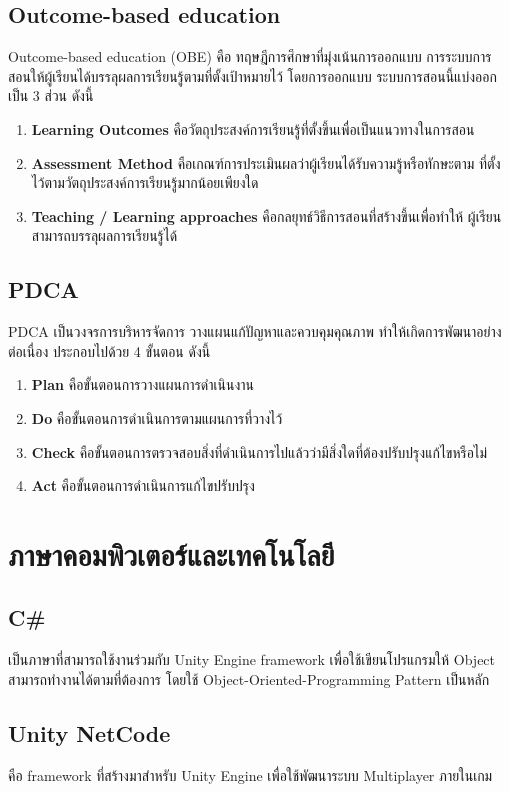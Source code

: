 \documentclass[12pt,oneside,openright,a4paper]{cpe-thai-project}
\begin{document}
\subsection{Outcome-based education \cite{obe}}
Outcome-based education (OBE) คือ ทฤษฎีการศึกษาที่มุ่งเน้นการออกแบบ
การระบบการสอนให้ผู้เรียนได้บรรลุผลการเรียนรู้ตามที่ตั้งเป้าหมายไว้ โดยการออกแบบ
ระบบการสอนนี้แบ่งออกเป็น 3 ส่วน ดังนี้
\begin{enumerate}
  \item \textbf{Learning Outcomes} คือวัตถุประสงค์การเรียนรู้ที่ตั้งขึ้นเพื่อเป็นแนวทางในการสอน
  \item \textbf{Assessment Method} คือเกณฑ์การประเมินผลว่าผู้เรียนได้รับความรู้หรือทักษะตาม
  ที่ตั้งไว้ตามวัตถุประสงค์การเรียนรู้มากน้อยเพียงใด
  \item \textbf{Teaching / Learning approaches} คือกลยุทธ์วิธีการสอนที่สร้างขึ้นเพื่อทำให้
  ผู้เรียนสามารถบรรลุผลการเรียนรู้ได้
\end{enumerate}


\subsection{PDCA \cite{pdca10}}
PDCA เป็นวงจรการบริหารจัดการ วางแผนแก้ปัญหาและควบคุมคุณภาพ ทำให้เกิดการพัฒนาอย่างต่อเนื่อง ประกอบไปด้วย 4 ขั้นตอน ดังนี้
\begin{enumerate}
  \item \textbf{Plan} คือขั้นตอนการวางแผนการดำเนินงาน
  \item \textbf{Do} คือขั้นตอนการดำเนินการตามแผนการที่วางไว้
  \item \textbf{Check} คือขั้นตอนการตรวจสอบสิ่งที่ดำเนินการไปแล้วว่ามีสิ่งใดที่ต้องปรับปรุงแก้ไขหรือไม่
  \item \textbf{Act} คือขั้นตอนการดำเนินการแก้ไขปรับปรุง
\end{enumerate}

\pagebreak
\section{ภาษาคอมพิวเตอร์และเทคโนโลยี}

\subsection{C\#}
เป็นภาษาที่สามารถใช้งานร่วมกับ Unity Engine framework 
เพื่อใช้เขียนโปรแกรมให้ Object สามารถทำงานได้ตามที่ต้องการ 
โดยใช้ Object-Oriented-Programming Pattern เป็นหลัก
\subsection{Unity NetCode}
คือ framework ที่สร้างมาสำหรับ Unity Engine เพื่อใช้พัฒนาระบบ 
Multiplayer ภายในเกม 
\end{document}
